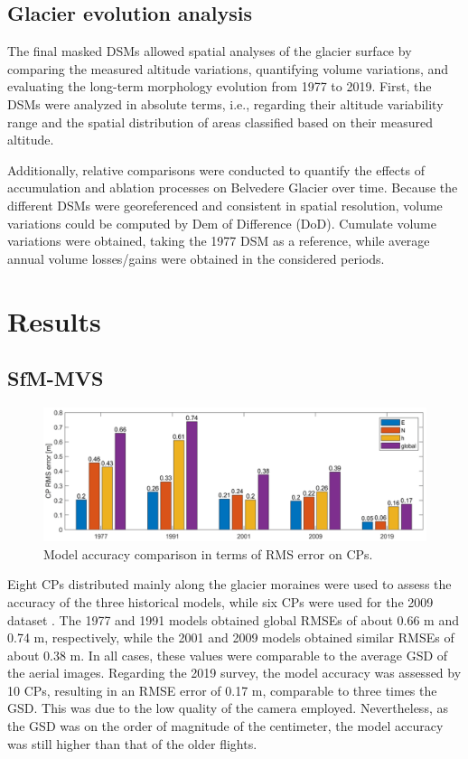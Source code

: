 \subsection{Glacier evolution analysis}\label{sec:2:glacier_evolution}

The final masked DSMs allowed spatial analyses of the glacier surface by comparing the measured altitude variations, quantifying volume variations, and evaluating the long-term morphology evolution from 1977 to 2019. 
First, the DSMs were analyzed in absolute terms, i.e., regarding their altitude variability range and the spatial distribution of areas classified based on their measured altitude. 

Additionally, relative comparisons were conducted to quantify the effects of accumulation and ablation processes on Belvedere Glacier over time.
Because the different DSMs were georeferenced and consistent in spatial resolution, volume variations could be computed by Dem of Difference (DoD).
Cumulate volume variations were obtained, taking the 1977 DSM as a reference, while average annual volume losses/gains were obtained in the considered periods.

\section{Results}\label{sec:2:results}

\subsection{SfM-MVS}\label{sec:2:res_reconstruction}

\begin{figure}[hb]
    \centering
    \includegraphics[width=1\textwidth]{cp_error.png}
    \caption{Model accuracy comparison in terms of RMS error on CPs. }
    \label{fig:2:cp_error}
\end{figure}

Eight CPs distributed mainly along the glacier moraines were used to assess the accuracy of the three historical models, while six CPs were used for the 2009 dataset .
The 1977 and 1991 models obtained global RMSEs of about 0.66 m and 0.74 m, respectively, while the 2001 and 2009 models obtained similar RMSEs of about 0.38 m.
In all cases, these values were comparable to the average GSD of the aerial images. Regarding the 2019 survey, the model accuracy was assessed by 10 CPs, resulting in an RMSE error of 0.17 m, comparable to three times the GSD. 
This was due to the low quality of the camera employed. 
Nevertheless, as the GSD was on the order of magnitude of the centimeter, the model accuracy was still higher than that of the older flights.


